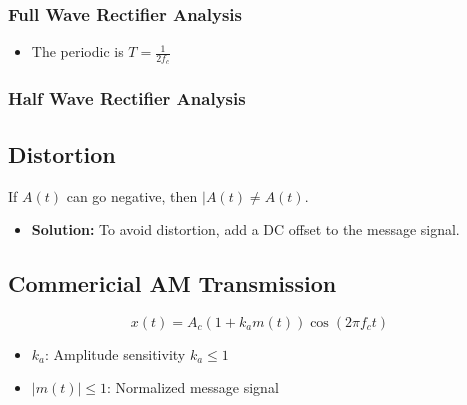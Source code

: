\subsubsection{Full Wave Rectifier Analysis}
\begin{derivation}
    \begin{itemize}
        \item The periodic is $T=\frac{1}{2f_c}$
    \end{itemize}
\end{derivation}

\subsubsection{Half Wave Rectifier Analysis}
\begin{derivation}
\end{derivation}

\subsection{Distortion}
\begin{definition}
    If $A(t)$ can go negative, then $|A(t) \neq A(t)$.
    \begin{itemize}
        \item \textbf{Solution:} To avoid distortion, add a DC offset to the message signal. 
    \end{itemize}
\end{definition}

\subsection{Commericial AM Transmission}
\begin{definition}
    \begin{equation*}
        x(t) = A_c \left(1 + k_a m(t)\right) \cos(2 \pi f_c t)
    \end{equation*}
    \begin{itemize}
        \item $k_a$: Amplitude sensitivity $k_a \leq 1$
        \item $|m(t)| \leq 1$: Normalized message signal
    \end{itemize}

\end{definition}

